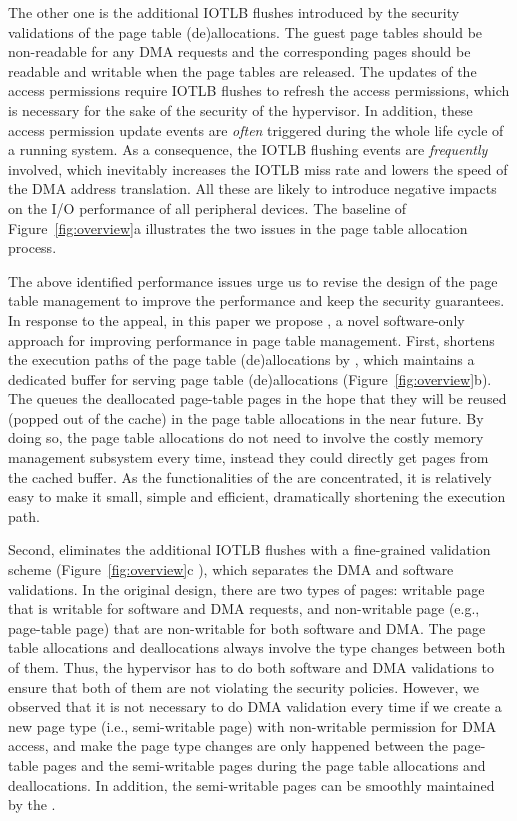 The other one is the additional IOTLB flushes introduced by the security validations of the page table (de)allocations.
The guest page tables should be non-readable for any DMA requests and the corresponding pages should be readable and writable when the page tables are released.
The updates of the access permissions require IOTLB flushes to refresh the access permissions, which is necessary for the sake of the security of the hypervisor.
In addition, these access permission update events are \emph{often} triggered during the whole life cycle of a running system.
As a consequence, the IOTLB flushing events are \emph{frequently} involved, which inevitably increases the IOTLB miss rate and lowers the speed of the DMA address translation.
All these are likely to introduce negative impacts on the I/O performance of all peripheral devices.
The baseline of Figure~\ref{fig:overview}a illustrates the two issues in the page table allocation process.

The above identified performance issues urge us to revise the design of the page table management to improve the performance and keep the security guarantees.
In response to the appeal, in this paper we propose \name, a novel software-only approach for improving performance in page table management.
First, \name shortens the execution paths of the page table (de)allocations by \cache, which maintains a dedicated buffer for serving page table (de)allocations (Figure~\ref{fig:overview}b).
The \cache queues the deallocated page-table pages in the hope that
they will be reused (popped out of the cache) in the page table allocations in the near future.
By doing so, the page table allocations do not need to involve the costly memory management subsystem every time, instead they could directly get pages from the cached buffer.
As the functionalities of the \cache are concentrated, it is relatively easy to make it small, simple and efficient, dramatically shortening the execution path.

Second, \name eliminates the additional IOTLB flushes with a fine-grained validation scheme (Figure~\ref{fig:overview}c ), which separates the DMA and software validations.
In the original design, there are two types of pages: writable page that is writable for software and DMA requests, and non-writable page (e.g., page-table page) that are non-writable for both software and DMA.
The page table allocations and deallocations always involve the type changes between both of them.
Thus, the hypervisor has to do both software and DMA validations to ensure that both of them are not violating the security policies.
However, we observed that it is not necessary to do DMA validation every time if we create a new page type (i.e., semi-writable page) with non-writable permission for DMA access, and make the page type changes are only happened between the page-table pages and the semi-writable pages during the page table allocations and deallocations.
In addition, the semi-writable pages can be smoothly maintained by the \cache.

